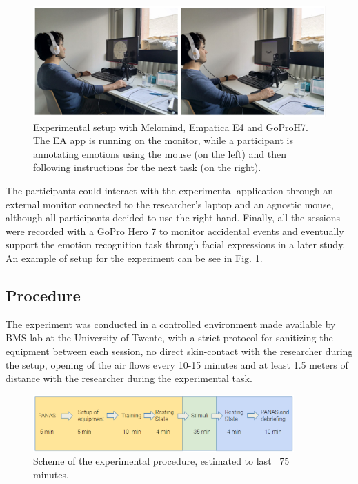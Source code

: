 \begin{figure}[h!]
\includegraphics[width=12cm]{img/methods/experimental_setup.png}
\centering
\caption{Experimental setup with Melomind, Empatica E4 and GoProH7. The EA app is running on the monitor, while a participant is annotating emotions using the mouse (on the left) and then following instructions for the next task (on the right).} \label{fig_experimental_setup}
\end{figure}

The participants could interact with the experimental application through an external monitor connected to the researcher’s laptop and an agnostic mouse, although all participants decided to use the right hand. Finally, all the sessions were recorded with a GoPro Hero 7 to monitor accidental events and eventually support the emotion recognition task through facial expressions in a later study. An example of setup for the experiment can be see in Fig. \ref{fig_experimental_setup}. 



\subsection{Procedure}
\label{sec:procedure}
The experiment was conducted in a controlled environment made available by BMS lab at the University of Twente, with a strict protocol for sanitizing the equipment between each session, no direct skin-contact with the researcher during the setup, opening of the air flows every 10-15 minutes and at least 1.5 meters of distance with the researcher during the experimental task.

\begin{figure}[h!]
\includegraphics[width=10cm]{img/methods/exp_procedure.png}
\centering
\caption{Scheme of the experimental procedure, estimated to last ~75 minutes.} \label{fig_exp_procedure}
\end{figure}

